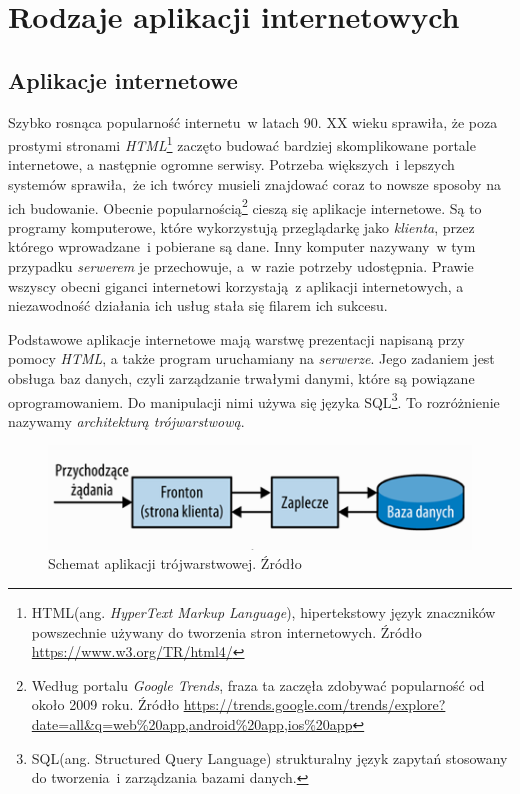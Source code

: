 \chapter{Rodzaje aplikacji internetowych}
\label{roz2}
\section{Aplikacje internetowe}
Szybko rosnąca popularność internetu~w latach 90. XX wieku sprawiła, że poza prostymi stronami \textit{HTML}\footnote{HTML(ang. \textit{HyperText Markup Language}), hipertekstowy język znaczników powszechnie używany do tworzenia stron internetowych. Źródło \url{https://www.w3.org/TR/html4/}} zaczęto budować bardziej skomplikowane portale internetowe, a następnie ogromne serwisy. Potrzeba większych~i lepszych systemów sprawiła,~że ich twórcy musieli znajdować coraz to nowsze sposoby na ich budowanie\cite{Newman:2016}. Obecnie popularnością\footnote{Według portalu \textit{Google Trends}, fraza ta zaczęła zdobywać popularność od około 2009 roku. Źródło \url{https://trends.google.com/trends/explore?date=all\&q=web\%20app,android\%20app,ios\%20app}} cieszą się aplikacje internetowe. Są to programy komputerowe, które wykorzystują przeglądarkę jako \textit{klienta}, przez którego wprowadzane~i pobierane są dane. Inny komputer nazywany~w tym przypadku \textit{serwerem} je przechowuje, a~w razie potrzeby udostępnia\cite{Nations:2019}. Prawie wszyscy obecni giganci internetowi korzystają~z aplikacji internetowych\cite{Newman:2016, Ziade:2018}, a niezawodność działania ich usług stała się filarem ich sukcesu.

Podstawowe aplikacje internetowe mają warstwę prezentacji napisaną przy pomocy \textit{HTML}, a także program uruchamiany na \textit{serwerze}. Jego zadaniem jest obsługa baz danych, czyli zarządzanie trwałymi danymi, które są powiązane oprogramowaniem\cite{Wilton:2005}. Do manipulacji nimi używa się języka SQL\footnote{SQL(ang. Structured Query Language) strukturalny język zapytań stosowany do tworzenia~i zarządzania bazami danych\cite{Wilton:2005}.}. To rozróżnienie nazywamy \textit{architekturą trójwarstwową}\cite{Folwer:2019}.

\begin{figure}[h!]
	\centering
		\includegraphics[width=12cm]{Rysunki/Rozdzial1/architektura_trojwarstwowa}
		\caption{Schemat aplikacji trójwarstwowej. Źródło \cite{Folwer:2019}}	
		\label{fig:architekturaTroj}
	\end{figure}

